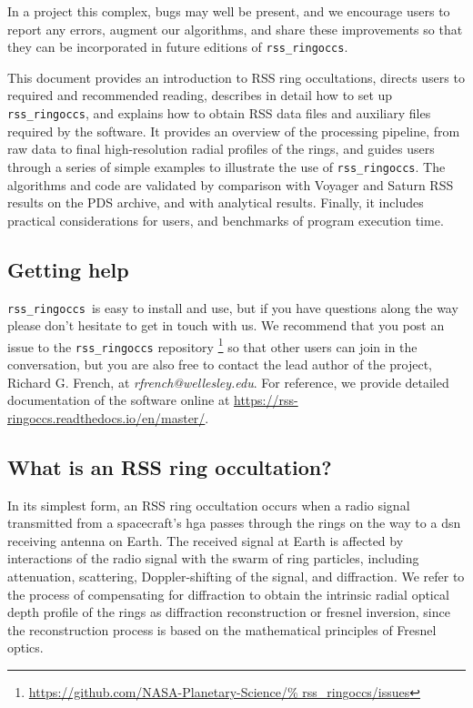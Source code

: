\documentclass[titlepage, 12pt]{article}
\begin{document}
        In a project this complex, bugs may well be present,
        and we encourage users to report any errors,
        augment our algorithms, and share these improvements
        so that they can be incorporated in future editions of
        \texttt{rss\_ringoccs}.
        \par\hfill\par
        This document provides an introduction to RSS ring
        occultations, directs users to required and recommended
        reading, describes in detail how to set up
        \texttt{rss\_ringoccs}, and explains how to
        obtain RSS data files and auxiliary files required
        by the software. It provides an overview of the
        processing pipeline, from raw data to final
        high-resolution radial profiles of the rings, and
        guides users through a series of simple examples to
        illustrate the use of \texttt{rss\_ringoccs}.
        The algorithms and code are validated by comparison
        with Voyager and Saturn RSS results on the PDS archive,
        and with analytical results. Finally, it includes
        practical considerations for users, and benchmarks
        of program execution time.
        \subsection{Getting help}
            \texttt{rss\_ringoccs}\ is easy to
            install and use, but if you have questions
            along the way please don't hesitate
            to get in touch with us. We recommend
            that you post an issue to the \texttt{rss\_ringoccs}
            repository%
            \footnote{\url{https://github.com/NASA-Planetary-Science/%
                      rss\_ringoccs/issues}}
            so that other users can join in
            the conversation, but you are also
            free to contact the lead author of the project, Richard G. French, at
            \textit{rfrench@wellesley.edu}. 
            For reference, we provide detailed documentation of
            the software online at
            \url{https://rss-ringoccs.readthedocs.io/en/master/}.
        \subsection{What is an RSS ring occultation?}
            In its simplest form, an RSS ring occultation occurs when a radio
            signal transmitted from a spacecraft's \gls{hga} passes
            through the rings on the way to a
            \gls{dsn} receiving antenna
            on Earth. The received signal at Earth is affected by
            interactions of the radio signal with the swarm of ring
            particles, including attenuation, scattering,
            Doppler-shifting of the signal,
            and diffraction. We refer to
            the process of compensating for diffraction to obtain the
            intrinsic radial optical depth profile of the rings as
            \gls{diffraction reconstruction}
            or \gls{fresnel inversion},
            since the reconstruction process is based
            on the mathematical principles of Fresnel optics. 
\end{document}
